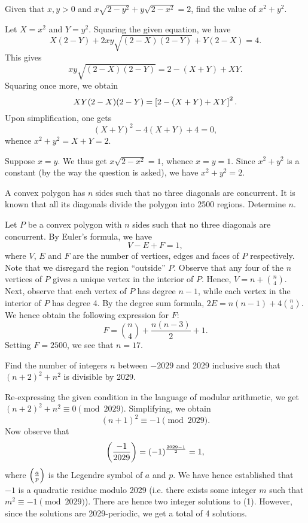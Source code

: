 \begin{question}[2]\label{Q::2024-O-1-15}
    Given that $x, y > 0$ and $x\sqrt{2-y^2} + y\sqrt{2-x^2} = 2$, find the value of $x^2 + y^2$.
\end{question}
\begin{solution}
    Let $X = x^2$ and $Y = y^2$. Squaring the given equation, we have \[X(2-Y) + 2xy\sqrt{(2-X)(2-Y)} + Y(2-X) = 4.\] This gives \[xy\sqrt{(2-X)(2-Y)} = 2 - (X+Y) + XY.\]Squaring once more, we obtain \[XY(2-X)(2-Y) = \left[ 2 - (X+Y) + XY \right]^2.\] Upon simplification, one gets \[(X+Y)^2 - 4(X+Y) + 4 = 0,\] whence $x^2 + y^2 = X + Y = 2$.
\end{solution}
\begin{solution}
    Suppose $x = y$. We thus get $x\sqrt{2- x^2} = 1$, whence $x = y = 1$. Since $x^2 + y^2$ is a constant (by the way the question is asked), we have $x^2 + y^2 = 2$.
\end{solution}

\begin{question}[17]\label{Q::2024-O-1-16}
    A convex polygon has $n$ sides such that no three diagonals are concurrent. It is known that all its diagonals divide the polygon into 2500 regions. Determine $n$.
\end{question}
\begin{solution*}
    Let $P$ be a convex polygon with $n$ sides such that no three diagonals are concurrent. By Euler's formula, we have \[V - E + F = 1,\] where $V$, $E$ and $F$ are the number of vertices, edges and faces of $P$ respectively. Note that we disregard the region ``outside'' $P$. Observe that any four of the $n$ vertices of $P$ gives a unique vertex in the interior of $P$. Hence, $V = n + \binom{n}{4}$. Next, observe that each vertex of $P$ has degree $n-1$, while each vertex in the interior of $P$ has degree 4. By the degree sum formula, $2E = n(n-1) + 4\binom{n}{4}$. We hence obtain the following expression for $F$: \[F = \binom{n}{4} + \frac{n(n-3)}2 + 1.\] Setting $F = 2500$, we see that $n = 17$.
\end{solution*}

\begin{question}[4]\label{Q::2024-O-1-17}
    Find the number of integers $n$ between $-2029$ and 2029 inclusive such that $(n+2)^2 + n^2$ is divisible by 2029.
\end{question}
\begin{solution*}
    Re-expressing the given condition in the language of modular arithmetic, we get $(n+2)^2 + n^2 \equiv 0 \pmod{2029}$. Simplifying, we obtain \[(n+1)^2 \equiv -1 \pmod{2029}.\tag{1}\] Now observe that \[\left( \frac{-1}{2029} \right) = (-1)^{\frac{2029-1}{2}} = 1,\] where $\left( \frac{a}{p} \right)$ is the Legendre symbol of $a$ and $p$. We have hence established that $-1$ is a quadratic residue modulo 2029 (i.e. there exists some integer $m$ such that $m^2 \equiv -1 \pmod{2029}$). There are hence two integer solutions to (1). However, since the solutions are 2029-periodic, we get a total of 4 solutions.
\end{solution*}

